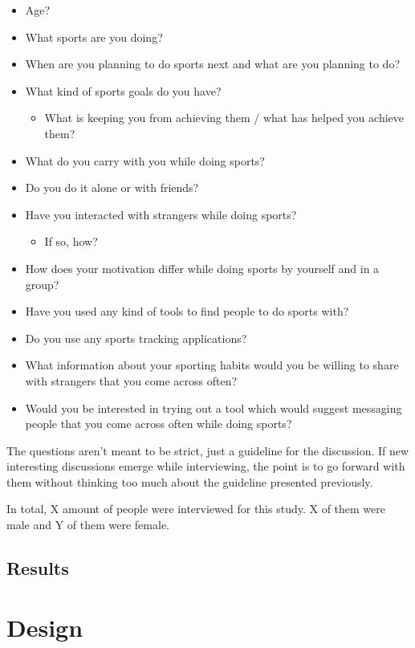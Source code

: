 \begin{itemize}
	\item Age?
	\item What sports are you doing?
	\item When are you planning to do sports next and what are you planning to do?
	\item What kind of sports goals do you have?
		\begin{itemize}
			\item What is keeping you from achieving them / what has helped you achieve them?
		\end{itemize}
	\item What do you carry with you while doing sports?
	\item Do you do it alone or with friends?
	\item Have you interacted with strangers while doing sports?
		\begin{itemize}
			\item If so, how?
		\end{itemize}
	\item How does your motivation differ while doing sports by yourself and in a group?
	\item Have you used any kind of tools to find people to do sports with?
	\item Do you use any sports tracking applications?
	\item What information about your sporting habits would you be willing to share with strangers that you come across often?
	\item Would you be interested in trying out a tool which would suggest messaging people that you come across often while doing sports?
\end{itemize}

The questions aren't meant to be strict, just a guideline for the discussion. If new interesting discussions emerge while interviewing, the point is to go forward with them without thinking too much about the guideline presented previously.

In total, X amount of people were interviewed for this study. X of them were male and Y of them were female.

\subsection{Results}



\section{Design}

